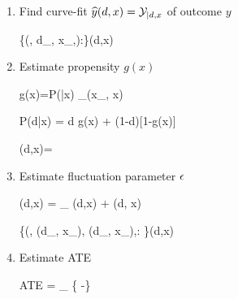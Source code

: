 \begin{enumerate}
\item Find curve-fit ${\widehat{y}}(d,x)={\cal Y}_{|d,x}$ of outcome $y$

\beq
\{(\s, d_\s, x_\s,):\s\in \Sigma\}\mlarr \haty(d,x)
\eeq

\item Estimate propensity $g(x)$

\beq
g(x)=P(|x)\approx
{}
{\sum_\s \delta(x_\s, x)}
\eeq

\beq
P(d|x) = d g(x) + (1-d)[1-g(x)]
\eeq

\beq
\beta(d,x)=
\eeq

\item Estimate fluctuation parameter $\epsilon$

\beq
\eta(d,x) =
\underbrace{\logit[\haty(d, x)]}_
{\lam(d,x)}
 + \eps \beta(d, x)
\eeq

\beq
\{(\s, \lam(d_\s, x_\s),
\beta(d_\s, x_\s),:
\s\in \Sigma\}\mlarr \HAT{\eta}(d,x)
\eeq

\item Estimate ATE

\beq
ATE =  \sum_\s
\left\{
 \expit[ \HAT{\eta}(d=1,x_\s)]
 -\expit[ \HAT{\eta}(d=0,x_\s)]
 \right\}
\eeq

\end{enumerate}
